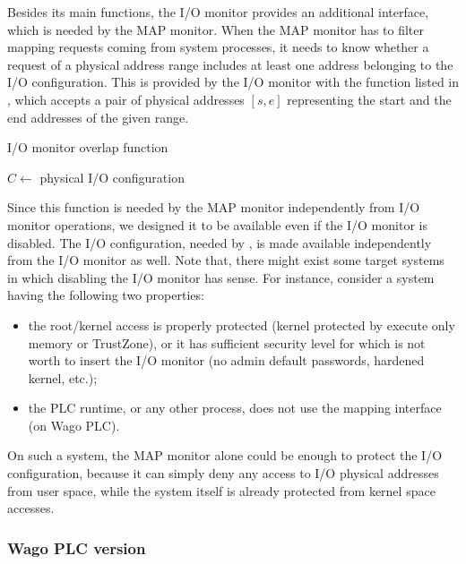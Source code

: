 Besides its main functions, the I/O monitor provides an additional interface, which is needed by the MAP monitor.
When the MAP monitor has to filter mapping requests coming from system processes, it needs to know whether a request of a physical address range includes
at least one address belonging to the I/O configuration. This is provided by the I/O monitor with the function listed in ,
which accepts a pair of physical addresses $[s, e]$ representing the start and the end addresses of the given range.
\begin{algorithm}[h]
\caption{I/O monitor overlap function}
\label{alg:io-overlap}
\begin{algorithmic}[1]
 
	\State $C \gets$ physical I/O configuration 
		 
			\State \Return \True
		\EndIf
	\EndFor
	\State \Return \False
\EndFunction
\end{algorithmic}
\end{algorithm}
Since this function is needed by the MAP monitor independently from I/O monitor operations, we designed it to be available even if the I/O monitor is disabled.
The I/O configuration, needed by , is made available independently from the I/O monitor as well.
Note that, there might exist some target systems in which disabling the I/O monitor has sense. For instance, consider a system having the following two properties:
\begin{itemize}
	\item the root/kernel access is properly protected (\eg kernel protected by execute only memory or TrustZone),
		or it has sufficient security level for which is not worth to insert the I/O monitor (\eg no admin default passwords, hardened kernel, etc.);
	\item the PLC runtime, or any other process, does not use the mapping interface (\ie on Wago PLC).
\end{itemize}
On such a system, the MAP monitor alone could be enough to protect the I/O configuration, because it can simply deny any access to I/O physical addresses from user space,
while the system itself is already protected from kernel space accesses.


\subsubsection{Wago PLC version}

